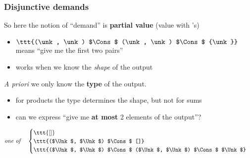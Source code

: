 \begin{frame}[fragile]
\frametitle{Disjunctive demands}

So here the notion of ``demand'' is \textbf{partial value} (value with \unk's)
\begin{itemize}
\item \pause $\ttt{(\unk, \unk) $\Cons$ (\unk, \unk) $\Cons$ {\unk}}$
  means ``give me the first two pairs''
\item \pause works when we know the \emph{shape} of the output
\end{itemize}

\vspace{10pt}
\pause \emph{A priori} we only know the \textbf{type} of the output.

\pause
\begin{itemize}
\item for products the type determines the shape, but not for sums
\item \pause can we express ``give me \textbf{at most} 2 elements of the output''?
\end{itemize}
\pause
\[
\text{\emph{one of}\quad}
\begin{cases}
\ttt{[]} \\
\ttt{($\Unk$, $\Unk$) $\Cons$ []} \\
\ttt{($\Unk$, $\Unk$) $\Cons$ ($\Unk$, $\Unk$) $\Cons$ $\Unk$}
\end{cases}
\]
\end{frame}
